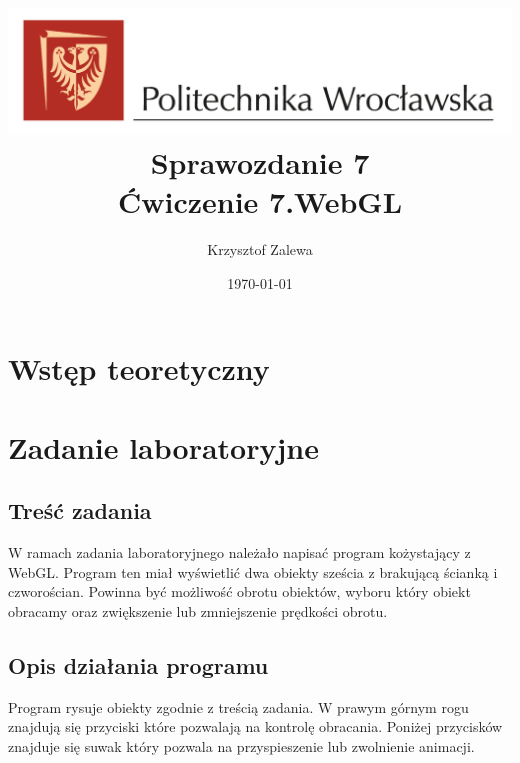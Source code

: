 \documentclass{article}
\title{
  \centering
  \includegraphics[width=\textwidth]{images/logo_PWr_kolor_poziom.png}\\
  \fontsize{28pt}{30pt}\selectfont Sprawozdanie 7\\
  \fontsize{14pt}{30pt}\selectfont Ćwiczenie 7.WebGL}
\author{Krzysztof Zalewa}
\date{\daymonthyear\today}
\begin{document}
    \maketitle
    \pagebreak
    \tableofcontents
    \FloatBarrier
    \section{Wstęp teoretyczny}
        \subsection{}
    \section{Zadanie laboratoryjne}
        \raggedright
        \subsection{Treść zadania}
            W ramach zadania laboratoryjnego należało napisać program kożystający z WebGL.
            Program ten miał wyświetlić dwa obiekty sześcia z brakującą ścianką i czworościan.
            Powinna być możliwość obrotu obiektów, wyboru który obiekt obracamy oraz zwiększenie
            lub zmniejszenie prędkości obrotu.
        \subsection{Opis działania programu}
            Program rysuje obiekty zgodnie z treścią zadania. W prawym górnym rogu znajdują się 
            przyciski które pozwalają na kontrolę obracania. Poniżej przycisków znajduje się suwak
            który pozwala na przyspieszenie lub zwolnienie animacji.
\end{document}
